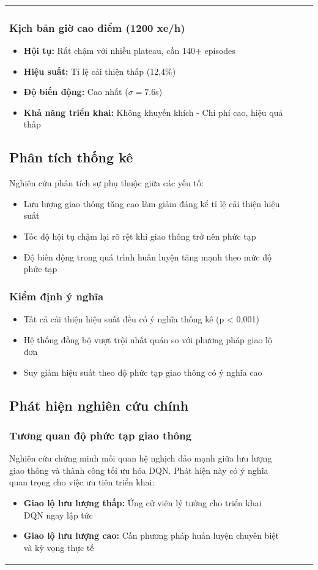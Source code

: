 \begin{table}[!htp]
\begin{tabular}{@{}lccc@{}}
\subsubsection{Kịch bản giờ cao điểm (1200 xe/h)}
\begin{itemize}
    \item \textbf{Hội tụ:} Rất chậm với nhiều plateau, cần 140+ episodes
    \item \textbf{Hiệu suất:} Tỉ lệ cải thiện thấp (12,4\%)
    \item \textbf{Độ biến động:} Cao nhất ($\sigma = 7.6$s)
    \item \textbf{Khả năng triển khai:} Không khuyến khích - Chi phí cao, hiệu quả thấp
\end{itemize}

\subsection{Phân tích thống kê}
Nghiên cứu phân tích sự phụ thuộc giữa các yếu tố:
\begin{itemize}
    \item Lưu lượng giao thông tăng cao làm giảm đáng kể tỉ lệ cải thiện hiệu suất
    \item Tốc độ hội tụ chậm lại rõ rệt khi giao thông trở nên phức tạp
    \item Độ biến động trong quá trình huấn luyện tăng mạnh theo mức độ phức tạp
\end{itemize}

\subsubsection{Kiểm định ý nghĩa}
\begin{itemize}
    \item Tất cả cải thiện hiệu suất đều có ý nghĩa thống kê (p < 0,001)
    \item Hệ thống đồng bộ vượt trội nhất quán so với phương pháp giao lộ đơn
    \item Suy giảm hiệu suất theo độ phức tạp giao thông có ý nghĩa cao
\end{itemize}

\subsection{Phát hiện nghiên cứu chính}

\subsubsection{Tương quan độ phức tạp giao thông}
Nghiên cứu chứng minh mối quan hệ nghịch đảo mạnh giữa lưu lượng giao thông và
thành công tối ưu hóa DQN. Phát hiện này có ý nghĩa quan trọng cho việc ưu tiên triển khai:
\begin{itemize}
    \item \textbf{Giao lộ lưu lượng thấp:} Ứng cử viên lý tưởng cho triển khai DQN ngay lập tức
    \item \textbf{Giao lộ lưu lượng cao:} Cần phương pháp huấn luyện chuyên biệt và kỳ vọng thực tế
\end{itemize}


\end{tabular}
\end{table}

